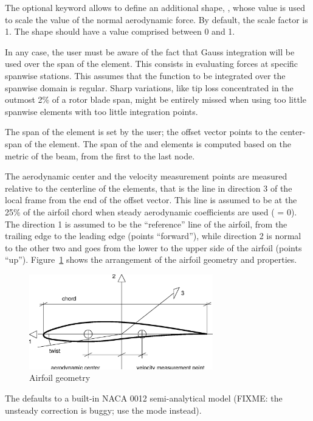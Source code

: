 The optional  keyword allows to define an additional shape,
,
whose value is used to scale the value of the normal aerodynamic force.
By default, the scale factor is 1.
The  shape should have a value comprised between 0 and 1.

In any case, the user must be aware of the fact that Gauss integration
will be used over the span of the element.
This consists in evaluating forces at specific spanwise stations.
This assumes that the function to be integrated over the spanwise domain
is regular.
Sharp variations, like tip loss concentrated in the outmost 2\%
of a rotor blade span, might be entirely missed when using too little
spanwise elements with too little integration points.

The span of the  element is set by the user;
the offset vector points to the center-span of the element.
The span of the  and  elements
is computed based on the metric of the beam, from the first to the last node.

The aerodynamic center and the velocity measurement points are measured
relative to the centerline of the elements, that is the line in direction 3
of the local frame from the end of the offset vector.
This line is assumed to be at the 25\% of the airfoil chord when steady
aerodynamic coefficients are used ( = 0).
The direction 1 is assumed to be the ``reference'' line of the airfoil, 
from the trailing edge to the leading edge (points ``forward''),
while direction 2 is normal to the other two and goes from the lower 
to the upper side of the airfoil (points ``up''). 
Figure~\ref{fig:AIRFOIL} shows the arrangement of the airfoil geometry 
and properties.

\begin{figure}[h]
  \centering
    \includegraphics[width=80mm]{airfoil.eps}
  \caption{Airfoil geometry}\label{fig:AIRFOIL}
\end{figure}

The  defaults to a built-in NACA 0012 semi-analytical
model (FIXME: the unsteady correction is buggy; use the  
mode instead).

